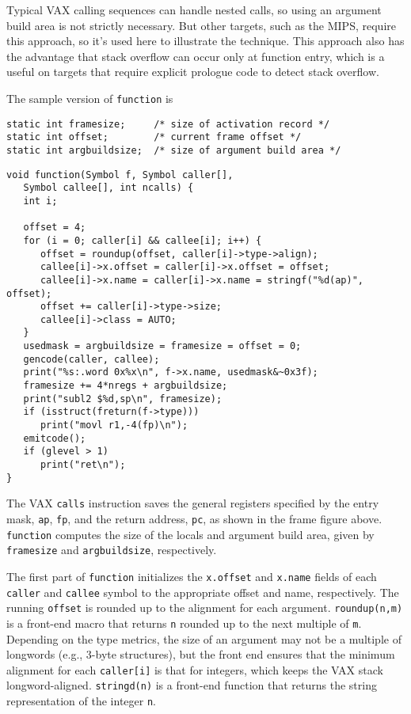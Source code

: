 Typical VAX calling sequences can handle nested calls,
so using an argument build area is not strictly necessary.
But other targets, such as the MIPS, require this approach,
so it's used here to illustrate the technique. This approach also
has the advantage that stack overflow can occur only at function
entry, which is a useful on targets that require explicit
prologue code to detect stack overflow.

The sample version of \verb|function| is
\begin{verbatim}
static int framesize;     /* size of activation record */
static int offset;        /* current frame offset */
static int argbuildsize;  /* size of argument build area */

\end{verbatim}
\begin{verbatim}
void function(Symbol f, Symbol caller[],
   Symbol callee[], int ncalls) {
   int i;

   offset = 4;
   for (i = 0; caller[i] && callee[i]; i++) {
      offset = roundup(offset, caller[i]->type->align);
      callee[i]->x.offset = caller[i]->x.offset = offset;
      callee[i]->x.name = caller[i]->x.name = stringf("%d(ap)", offset);
      offset += caller[i]->type->size;
      callee[i]->class = AUTO;
   }
   usedmask = argbuildsize = framesize = offset = 0;
   gencode(caller, callee);
   print("%s:.word 0x%x\n", f->x.name, usedmask&~0x3f);
   framesize += 4*nregs + argbuildsize;
   print("subl2 $%d,sp\n", framesize);
   if (isstruct(freturn(f->type)))
      print("movl r1,-4(fp)\n");
   emitcode();
   if (glevel > 1)
      print("ret\n");
}
\end{verbatim}
The VAX \verb|calls| instruction saves the general registers specified
by the entry mask, \verb|ap|, \verb|fp|,
and the return address, \verb|pc|, as shown in the frame figure above.
\verb|function| computes the size of the locals and argument build area,
given by \verb|framesize| and \verb|argbuildsize|, respectively.

The first part of \verb|function| initializes the \verb|x.offset| and \verb|x.name| fields
of each \verb|caller| and \verb|callee| symbol to the appropriate offset and name, respectively.
The running \verb|offset| is rounded up to the alignment for each argument.
\verb|roundup(n,m)| is a front-end macro that returns \verb|n| rounded up to the
next multiple of \verb|m|. Depending on the type metrics, the size of an
argument may not be a multiple of longwords (e.g., 3-byte structures),
but the front end ensures that the minimum alignment for each \verb|caller[i]|
is that for integers, which keeps the VAX stack longword-aligned.
\verb|stringd(n)| is a front-end function that returns the string
representation of the integer \verb|n|.

